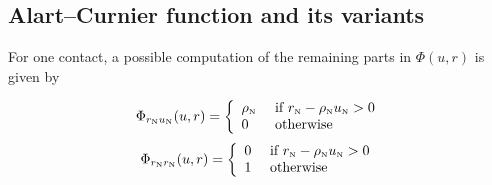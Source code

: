 \subsection*{Alart--Curnier function and its variants}
\label{Sec:Phi-AC-II}

For one contact, a possible computation of the remaining parts in $\Phi(u, r)$  is given by

\begin{equation}
  \label{eq:Phi-AC-II-rnun}
   \Phi_{r_\n u_\n}(u,r) =  \left\{
   \begin{array}{ll}
     \rho_{\n} & \text{ if }  r_{\n} - \rho_{\n} u_{\n} > 0 \\
     0  & \text{ otherwise }
    \end{array}\right.
\end{equation}
\begin{equation}
  \label{eq:Phi-AC-II-rnrn}
  \Phi_{r_\n r_\n}(u,r) =
  \left\{
    \begin{array}{ll}
      0 & \text{ if }  r_{\n} - \rho_{\n} u_{\n} > 0 \\
      1  & \text{ otherwise }
    \end{array}\right.
\end{equation}

